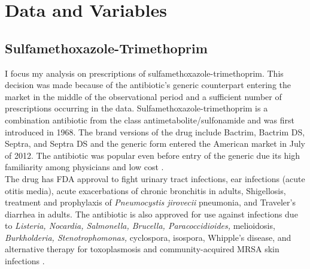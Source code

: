 \chapter{Data and Variables}
\section{Sulfamethoxazole-Trimethoprim}
\indent I focus my analysis on prescriptions of sulfamethoxazole-trimethoprim. This decision was made because of the antibiotic's generic counterpart entering the market in the middle of the observational period and a sufficient number of prescriptions occurring in the data. Sulfamethoxazole-trimethoprim is a combination antibiotic from the class antimetabolite/sulfonamide and was first introduced in 1968. The brand versions of the drug include Bactrim, Bactrim DS, Septra, and Septra DS and the generic form entered the American market in July of 2012. The antibiotic was popular even before entry of the generic due its high familiarity among physicians and low cost \cite{noauthor_sulfamethoxazole_nodate,ho_considerations_2011}.\\
\indent The drug has FDA approval to fight urinary tract infections, ear infections (acute otitis media), acute exacerbations of chronic bronchitis in adults, Shigellosis, treatment and prophylaxis of \textit{Pneumocystis jirovecii} pneumonia, and Traveler's diarrhea in adults. The antibiotic is also approved for use against infections due to \textit{Listeria, Nocardia, Salmonella, Brucella, Paracoccidioides,} melioidosis, \textit{Burkholderia, Stenotrophomonas,} cyclospora, isospora, Whipple's disease, and alternative therapy for toxoplasmosis and community-acquired MRSA skin infections \cite{schlossberg_antibiotics_2017}.

